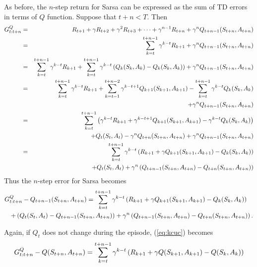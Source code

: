 As before, the $n$-step return for Sarsa can be expressed as the sum of TD errors in terms of $Q$ function.
Suppose that $t+n<T$. Then
\begin{eqnarray*}
G^{Q}_{{t}:{t+n}}
&=&
R_{t+1} + \gamma R_{t+2} + \gamma^2 R_{t+3} + \cdots + \gamma^{n-1} R_{t+n} + \gamma^n Q_{t+n-1}(S_{t+n}, A_{t+n})
\\
&=&
\sum_{k=t}^{t+n-1} \gamma^{k-t} R_{k+1} + \gamma^n Q_{t+n-1}(S_{t+n}, A_{t+n})
\\
&=&
\sum_{k=t}^{t+n-1} \gamma^{k-t} R_{k+1}
+ \sum_{k=t}^{t+n-1} \gamma^{k-t} \left( Q_{k}(S_{k},A_{k}) - Q_{k}(S_{k},A_{k}) \right)
+ \gamma^n Q_{t+n-1}(S_{t+n}, A_{t+n})
\\
&=&
\sum_{k=t}^{t+n-1} \gamma^{k-t} R_{k+1}
+ \sum_{k=t-1}^{t+n-2} \gamma^{k-t+1} Q_{k+1}(S_{k+1},A_{k+1})
- \sum_{k=t}^{t+n-1} \gamma^{k-t} Q_{k}(S_{k},A_{k})
\\
&&+ \gamma^n Q_{t+n-1}(S_{t+n}, A_{t+n})
\\
&=&
\sum_{k=t}^{t+n-1} \left( \gamma^{k-t} R_{k+1} + \gamma^{k-t+1} Q_{k+1}(S_{k+1},A_{k+1}) - \gamma^{k-t} Q_{k}(S_{k},A_{k}) \right)
\\
&&
+ Q_{t}(S_{t},A_{t}) - \gamma^{n}Q_{t+n}(S_{t+n}, A_{t+n}) + \gamma^n Q_{t+n-1}(S_{t+n}, A_{t+n})
\\
&=&
\sum_{k=t}^{t+n-1} \gamma^{k-t} \left( R_{k+1} + \gamma Q_{k+1}(S_{k+1},A_{k+1}) - Q_{k}(S_{k},A_{k}) \right)
\\
&&
+ Q_{t}(S_{t},A_{t}) + \gamma^n \left( Q_{t+n-1}(S_{t+n}, A_{t+n}) - Q_{t+n}(S_{t+n}, A_{t+n}) \right)
\end{eqnarray*}
Thus the $n$-step error for Sarsa becomes
\begin{eqnarray}
\nonumber
\lefteqn{
\nstepqreturn{t}{t+n} - Q_{t+n-1}(\state{t+n},\action{t+n})
=
\sum_{k=t}^{t+n-1} \df^{k-t} \left( \reward{k+1} + \df Q_{k+1}(\state{k+1},\action{k+1}) - Q_{k}(\state{k},\action{k}) \right)
}
\\
&&
+ \left( Q_{t}(\state{t},\action{t}) - Q_{t+n-1}(\state{t+n},\action{t+n}) \right)
+ \df^n \left( Q_{t+n-1}(\state{t+n}, \action{t+n}) - Q_{t+n}(\state{t+n}, \action{t+n}) \right).
\label{eq:kcuc}
\end{eqnarray}

Again, if $Q_{t}$ does not change during the episode, (\ref{eq:kcuc}) becomes
\begin{equation}
G^{Q}_{{t}:{t+n}} - Q(S_{t+n},A_{t+n})
=
\sum_{k=t}^{t+n-1} \gamma^{k-t} \left( R_{k+1} + \gamma Q(S_{k+1},A_{k+1}) - Q(S_{k},A_{k}) \right)
\end{equation}




